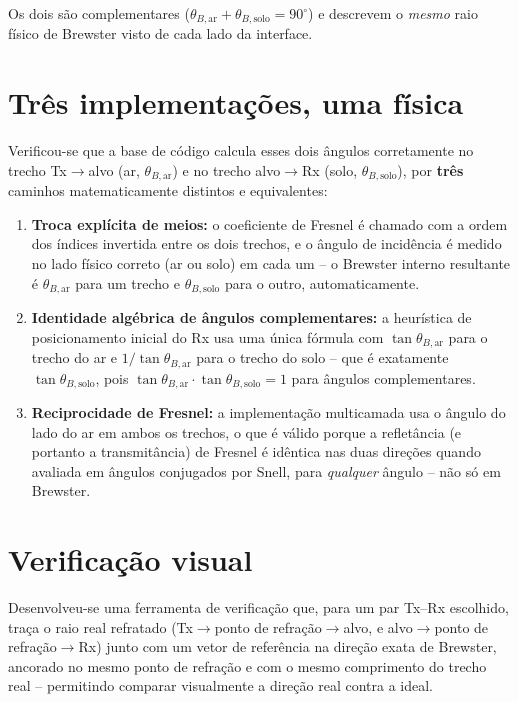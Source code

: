 \documentclass[12pt,a4paper,oneside]{book}
\theoremstyle{definition}
\theoremstyle{remark}
\newcommand{\thetaBar}{\theta_{B,\mathrm{ar}}}
\newcommand{\thetaBsolo}{\theta_{B,\mathrm{solo}}}
\begin{document}
Os dois são complementares ($\thetaBar+\thetaBsolo=90^\circ$) e descrevem o
\emph{mesmo} raio físico de Brewster visto de cada lado da interface.

\section{Três implementações, uma física}

Verificou-se que a base de código calcula esses dois ângulos corretamente
no trecho Tx$\to$alvo (ar, $\thetaBar$) e no trecho alvo$\to$Rx (solo,
$\thetaBsolo$), por \textbf{três} caminhos matematicamente distintos e
equivalentes:

\begin{enumerate}
  \item \textbf{Troca explícita de meios:} o coeficiente de Fresnel é
  chamado com a ordem dos índices invertida entre os dois trechos, e o
  ângulo de incidência é medido no lado físico correto (ar ou solo) em
  cada um -- o Brewster interno resultante é $\thetaBar$ para um trecho e
  $\thetaBsolo$ para o outro, automaticamente.
  \item \textbf{Identidade algébrica de ângulos complementares:} a
  heurística de posicionamento inicial do Rx usa uma única fórmula com
  $\tan\thetaBar$ para o trecho do ar e $1/\tan\thetaBar$ para o trecho do
  solo -- que é exatamente $\tan\thetaBsolo$, pois
  $\tan\thetaBar\cdot\tan\thetaBsolo=1$ para ângulos complementares.
  \item \textbf{Reciprocidade de Fresnel:} a implementação multicamada usa
  o ângulo do lado do ar em ambos os trechos, o que é válido porque a
  refletância (e portanto a transmitância) de Fresnel é idêntica nas duas
  direções quando avaliada em ângulos conjugados por Snell, para
  \emph{qualquer} ângulo -- não só em Brewster.
\end{enumerate}

\section{Verificação visual}

Desenvolveu-se uma ferramenta de verificação que, para um par Tx--Rx
escolhido, traça o raio real refratado (Tx$\to$ponto de refração$\to$alvo,
e alvo$\to$ponto de refração$\to$Rx) junto com um vetor de referência na
direção exata de Brewster, ancorado no mesmo ponto de refração e com o
mesmo comprimento do trecho real -- permitindo comparar visualmente a
direção real contra a ideal.
\end{document}
